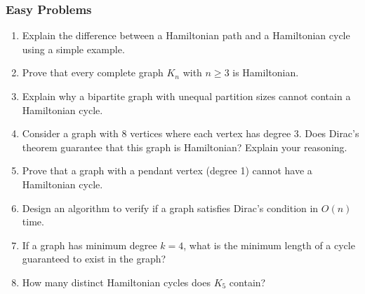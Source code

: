 \documentclass{article}
\theoremstyle{definition}
\begin{document}
\subsubsection{Easy Problems}
\begin{enumerate}
\item Explain the difference between a Hamiltonian path and a Hamiltonian cycle using a simple example.

\item Prove that every complete graph $K_n$ with $n \geq 3$ is Hamiltonian.

\item Explain why a bipartite graph with unequal partition sizes cannot contain a Hamiltonian cycle.

\item Consider a graph with 8 vertices where each vertex has degree 3. Does Dirac's theorem guarantee that this graph is Hamiltonian? Explain your reasoning.

\item Prove that a graph with a pendant vertex (degree 1) cannot have a Hamiltonian cycle.

\item Design an algorithm to verify if a graph satisfies Dirac's condition in $O(n)$ time.

\item If a graph has minimum degree $k=4$, what is the minimum length of a cycle guaranteed to exist in the graph?

\item How many distinct Hamiltonian cycles does $K_5$ contain?
\end{enumerate}
\end{document}

